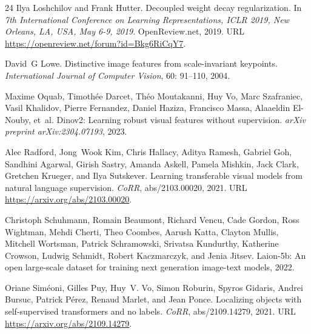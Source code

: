 \documentclass[10pt]{article} \usepackage[preprint]{tmlr}
\begin{document}
\begin{thebibliography}{24}
Ilya Loshchilov and Frank Hutter.
\newblock Decoupled weight decay regularization.
\newblock In \emph{7th International Conference on Learning Representations,
  {ICLR} 2019, New Orleans, LA, USA, May 6-9, 2019}. OpenReview.net, 2019.
\newblock URL \url{https://openreview.net/forum?id=Bkg6RiCqY7}.

David~G Lowe.
\newblock Distinctive image features from scale-invariant keypoints.
\newblock \emph{International Journal of Computer Vision}, 60:
  91--110, 2004.

Maxime Oquab, Timoth{\'e}e Darcet, Th{\'e}o Moutakanni, Huy Vo, Marc
  Szafraniec, Vasil Khalidov, Pierre Fernandez, Daniel Haziza, Francisco Massa,
  Alaaeldin El-Nouby, et~al.
\newblock Dinov2: Learning robust visual features without supervision.
\newblock \emph{arXiv preprint arXiv:2304.07193}, 2023.

Alec Radford, Jong~Wook Kim, Chris Hallacy, Aditya Ramesh, Gabriel Goh,
  Sandhini Agarwal, Girish Sastry, Amanda Askell, Pamela Mishkin, Jack Clark,
  Gretchen Krueger, and Ilya Sutskever.
\newblock Learning transferable visual models from natural language
  supervision.
\newblock \emph{CoRR}, abs/2103.00020, 2021.
\newblock URL \url{https://arxiv.org/abs/2103.00020}.

Christoph Schuhmann, Romain Beaumont, Richard Vencu, Cade Gordon, Ross
  Wightman, Mehdi Cherti, Theo Coombes, Aarush Katta, Clayton Mullis, Mitchell
  Wortsman, Patrick Schramowski, Srivatsa Kundurthy, Katherine Crowson, Ludwig
  Schmidt, Robert Kaczmarczyk, and Jenia Jitsev.
\newblock Laion-5b: An open large-scale dataset for training next generation
  image-text models, 2022.

Oriane Sim{\'e}oni, Gilles Puy, Huy~V. Vo, Simon Roburin, Spyros Gidaris,
  Andrei Bursuc, Patrick P{\'e}rez, Renaud Marlet, and Jean Ponce.
\newblock Localizing objects with self-supervised transformers and no labels.
\newblock \emph{CoRR}, abs/2109.14279, 2021.
\newblock URL \url{https://arxiv.org/abs/2109.14279}.


\end{thebibliography}
\end{document}
